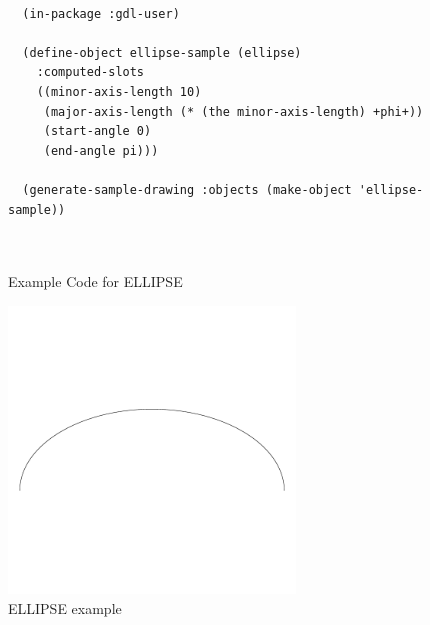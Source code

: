 \documentclass [11pt]{book}
\begin{document}
\begin{itemize}
\begin{description}
\end{description}




\begin{figure}
\begin{lrbox}{\boxedverb}
\begin{minipage}{\linewidth}
{\small

\begin{verbatim}
  
  (in-package :gdl-user)

  (define-object ellipse-sample (ellipse)
    :computed-slots
    ((minor-axis-length 10)
     (major-axis-length (* (the minor-axis-length) +phi+))
     (start-angle 0)
     (end-angle pi)))

  (generate-sample-drawing :objects (make-object 'ellipse-sample))
  
  
\end{verbatim}}
\end{minipage}
\end{lrbox}
\fbox{\usebox{\boxedverb}}

\caption{Example Code for ELLIPSE}

\label{fig:example-code-ELLIPSE}

\end{figure}

\begin{figure}
\begin{center}
\includegraphics[width=3in,height=3in]{../images/example-ELLIPSE.pdf}
\end{center}

\caption{ELLIPSE example}

\label{fig:ELLIPSE}

\end{figure}






\end{itemize}
\end{document}

